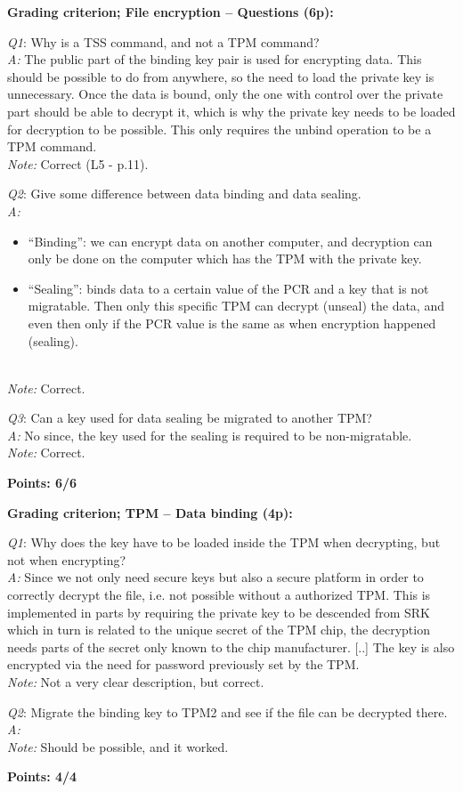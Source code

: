 \documentclass{article}
\newcommand{\grade}[5]{
  \textbf{Grading criterion; #1 (#3p):}\textit{#4}

  #5
  \hfill
  \begin{varwidth}{\linewidth}
    \textbf{Points: #2/#3}
  \end{varwidth}
}
\newcommand{\QAN}[5]{
  \textit{Q#1}:#3  \\
  \ifthenelse{\equal{#2}{C}}{
    \def \grading {\Large\textcolor{green}{\checkmark}\normalsize}
  }{
    \def \grading {\Large\textcolor{red}{\textbf{x}\hspace{0.142cm}}\normalsize}
  }
  \textit{A:}#4\hfill\grading \\
  \textit{Note:}#5
}
\newcommand{\escape}[1]{\PVerb{#1}}
\begin{document}
  \grade{File encryption -- Questions}{6}{6}
  {}
  {
    \QAN{1}{C}{ %
      Why is \escape{TSS_Bind} a TSS command, and not a TPM command?
    }{ %
The public part of the binding key pair is used for encrypting data. This should be
possible to do from anywhere, so the need to load the private key is unnecessary.
Once the data is bound, only the one with control over the private part should be
able to decrypt it, which is why the private key needs to be loaded for decryption to
be possible. This only requires the unbind operation to be a TPM command.
    }{ %
      Correct (L5 - p.11).
    }

    \QAN{2}{C}{ %
      Give some difference between data binding and data sealing.
    }{ %
\begin{itemize}
	\item “Binding”: we can encrypt data on another computer, and decryption can only be
done on the computer which has the TPM with the private key. 
	\item “Sealing”: binds data to a certain value of the PCR and a key that is not migratable.
Then only this specific TPM can decrypt (unseal) the data, and even then only if the
PCR value is the same as when encryption happened (sealing). 
\end{itemize}
    }{ %
      Correct.
    }

    \QAN{3}{C}{ %
      Can a key used for data sealing be migrated to another TPM?
    }{ %
No since, the key used for the sealing is required to be non-migratable.      
    }{ %
      Correct.
    }
  }

  \grade{TPM -- Data binding}{4}{4}
  {}
  {
    \QAN{1}{C}{ %
      Why does the key have to be loaded inside the TPM when decrypting, but
      not when encrypting?
    }{ %
Since we not only need secure keys but also a secure platform in order to correctly
decrypt the file, i.e. not possible without a authorized TPM. This is implemented
in parts by requiring the private key to be descended from SRK which in turn is
related to the unique secret of the TPM chip, the decryption needs parts of the secret
only known to the chip manufacturer. [..] The key is also encrypted via the need for
password previously set by the TPM.
    }{ %
	Not a very clear description, but correct. 
    }

    \QAN{2}{C}{ %
      Migrate the binding key to TPM2 and see if the file can be decrypted
      there.
    }{ %
    }{ %
      Should be possible, and it worked.
    }
  }
\end{document}
